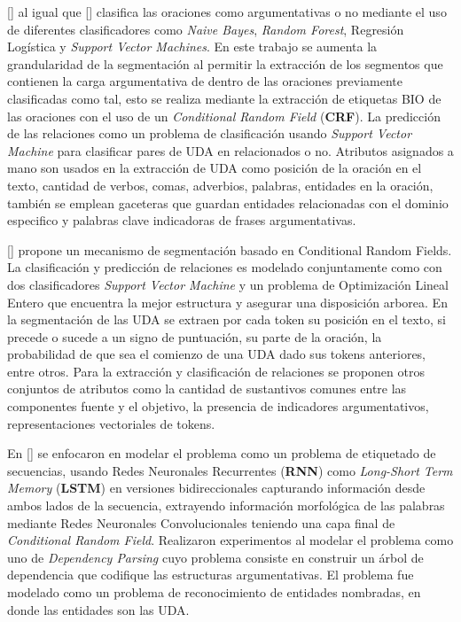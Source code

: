 [\cite{goudas2015argument}] al igual que [\cite{palau2009argumentation}] clasifica las oraciones como
argumentativas o no mediante el uso de diferentes clasificadores como \emph{Naive Bayes}, \emph{Random Forest}, Regresión
Logística y \emph{Support Vector Machines}. En este trabajo se aumenta la grandularidad de la segmentación al permitir
la extracción de los segmentos que contienen la carga argumentativa de dentro de las oraciones previamente clasificadas
como tal, esto se realiza mediante la extracción de etiquetas BIO de las oraciones con el uso de un 
\emph{Conditional Random Field} (\textbf{CRF}). La predicción de las relaciones como un problema de clasificación
usando \emph{Support Vector Machine} para clasificar pares de UDA en relacionados o no. Atributos asignados a mano 
son usados en la extracción de UDA como posición de la oración en el texto, cantidad de verbos, comas, adverbios,
palabras, entidades en la oración, también se emplean gaceteras que guardan entidades relacionadas con el dominio 
especifico y palabras clave indicadoras de frases argumentativas. 

[\cite{stab2017parsing}] propone un mecanismo de segmentación basado en Conditional Random Fields. La clasificación
y predicción de relaciones es modelado conjuntamente como con dos clasificadores \emph{Support Vector Machine} y un problema
de Optimización Lineal Entero que encuentra la mejor estructura y asegurar una disposición arborea. En la segmentación
de las UDA se extraen por cada token su posición en el texto, si precede o sucede a un signo de puntuación, su parte de
la oración, la probabilidad de que sea el comienzo de una UDA dado sus tokens anteriores, entre otros. Para la extracción
y clasificación de relaciones se proponen otros conjuntos de atributos como la cantidad de sustantivos comunes entre
las componentes fuente y el objetivo, la presencia de indicadores argumentativos, representaciones vectoriales de tokens.

En [\cite{eger2017neural}] se enfocaron en
modelar el problema como un problema de etiquetado de secuencias, usando Redes Neuronales Recurrentes (\textbf{RNN}) como 
\emph{Long-Short Term Memory} (\textbf{LSTM}) en versiones bidireccionales capturando información desde ambos lados de la secuencia,
extrayendo información morfológica de las palabras mediante Redes Neuronales Convolucionales teniendo una capa final de
\emph{Conditional Random Field}. Realizaron experimentos al modelar el problema como uno de \emph{Dependency Parsing} cuyo problema
consiste en construir un árbol de dependencia que codifique las estructuras argumentativas. El problema fue modelado
como un problema de reconocimiento de entidades nombradas, en donde las entidades son las UDA.

